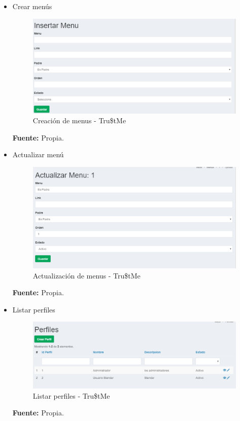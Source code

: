 {{\begin{itemize}
		\item Crear menús
		\begin{figure}[H]
			\centering
			\includegraphics[width=1\linewidth]{development/crearmenu.png}
			\caption{Creación de menus - Tru\$tMe}
		\end{figure}
		\begin{center}
			\textbf{Fuente:} Propia.
		\end{center}
	
		\item Actualizar menú
		\begin{figure}[H]
			\centering
			\includegraphics[width=1\linewidth]{development/actualizarmenu.png}
			\caption{Actualización de menus - Tru\$tMe}
		\end{figure}
		\begin{center}
			\textbf{Fuente:} Propia.
		\end{center}
		
		\item Listar perfiles
		\begin{figure}[H]
			\centering
			\includegraphics[width=1\linewidth]{development/listarperfiles.png}
			\caption{Listar perfiles - Tru\$tMe}
		\end{figure}
		\begin{center}
			\textbf{Fuente:} Propia.
		\end{center}
		\hfill
		

\end{itemize}}}
